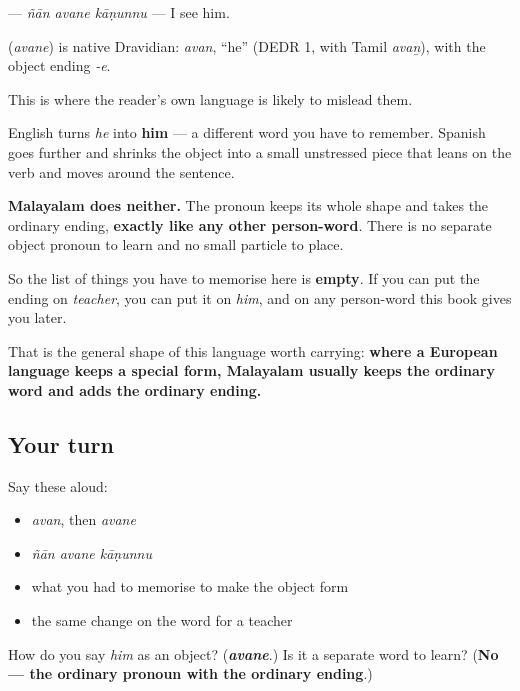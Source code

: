 \textbf{  } — \emph{ñān avane kāṇunnu} — I see him.

\begin{cousinweb}
\textbf{} (\emph{avane}) is native Dravidian: \emph{avan}, \textquotedblleft{}he\textquotedblright{} (DEDR 1, with Tamil \emph{avaṉ}), with the object ending \emph{-e}.
\end{cousinweb}

\begin{culture}
This is where the reader's own language is likely to mislead them.

English turns \emph{he} into \textbf{him} — a different word you have to remember. Spanish goes further and shrinks the object into a small unstressed piece that leans on the verb and moves around the sentence.

\textbf{Malayalam does neither.} The pronoun keeps its whole shape and takes the ordinary ending, \textbf{exactly like any other person-word}. There is no separate object pronoun to learn and no small particle to place.

So the list of things you have to memorise here is \textbf{empty}. If you can put the ending on \emph{teacher}, you can put it on \emph{him}, and on any person-word this book gives you later.

That is the general shape of this language worth carrying: \textbf{where a European language keeps a special form, Malayalam usually keeps the ordinary word and adds the ordinary ending.}
\end{culture}

\subsection*{Your turn}
Say these aloud:

\begin{itemize}
\raggedright
  \item \emph{avan}, then \emph{avane}
  \item \emph{ñān avane kāṇunnu}
  \item what you had to memorise to make the object form
  \item the same change on the word for a teacher
\end{itemize}

\begin{tcolorbox}[breakable,colback=teal!4,colframe=teal!35!black,title={Before you move on}]
How do you say \emph{him} as an object? (\emph{\textbf{avane}}.) Is it a separate word to learn? (\textbf{No — the ordinary pronoun with the ordinary ending}.)
\end{tcolorbox}
